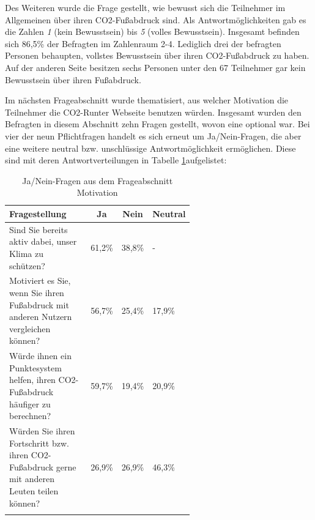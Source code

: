 Des Weiteren wurde die Frage gestellt, wie bewusst sich die Teilnehmer im Allgemeinen über ihren CO2-Fußabdruck sind.
Als Antwortmöglichkeiten gab es die Zahlen \textit{1} (kein Bewusstsein) bis \textit{5} (volles Bewusstsein).
Insgesamt befinden sich 86,5\% der Befragten im Zahlenraum 2-4.
Lediglich drei der befragten Personen behaupten, vollstes Bewusstsein über ihren CO2-Fußabdruck zu haben.
Auf der anderen Seite besitzen sechs Personen unter den 67 Teilnehmer gar kein Bewusstsein über ihren Fußabdruck.

Im nächsten Frageabschnitt wurde thematisiert, aus welcher Motivation die Teilnehmer die CO2-Runter Webseite benutzen würden.
Insgesamt wurden den Befragten in diesem Abschnitt zehn Fragen gestellt, wovon eine optional war.
Bei vier der neun Pflichtfragen handelt es sich erneut um Ja/Nein-Fragen, die aber eine weitere neutral bzw. unschlüssige Antwortmöglichkeit ermöglichen.
Diese sind mit deren Antwortverteilungen in Tabelle \ref{motivationFragen}aufgelistet:

\begin{longtable}{|p{0.6\linewidth}|l|l|l|}
    \hline
    \multicolumn{1}{|l|}{\textbf{Fragestellung}}                                                   &
    \multicolumn{1}{c|}{\textbf{Ja}}                                                               &
    \multicolumn{1}{c|}{\textbf{Nein}}                                                             &
    \multicolumn{1}{r|}{\textbf{Neutral}}                                                                                     \\ \hline
    \endfirsthead

    Sind Sie bereits aktiv dabei, unser Klima zu schützen?                                         & 61,2\% & 38,8\% & -      \\ \hline
    Motiviert es Sie, wenn Sie ihren Fußabdruck mit anderen Nutzern vergleichen können?            & 56,7\% & 25,4\% & 17,9\% \\ \hline
    Würde ihnen ein Punktesystem helfen, ihren CO2-Fußabdruck häufiger zu berechnen?               & 59,7\% & 19,4\% & 20,9\% \\ \hline
    Würden Sie ihren Fortschritt bzw. ihren CO2-Fußabdruck gerne mit anderen Leuten teilen können? & 26,9\% & 26,9\% & 46,3\% \\ \hline
    \caption{Ja/Nein-Fragen aus dem Frageabschnitt Motivation}
    \label{motivationFragen}
    \\
\end{longtable}

